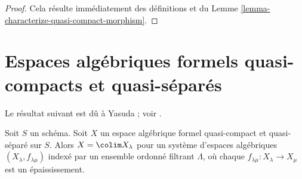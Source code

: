 \begin{proof}
Cela résulte immédiatement des définitions et du
Lemme \ref{lemma-characterize-quasi-compact-morphism}.
\end{proof}





\section{Espaces algébriques formels quasi-compacts et quasi-séparés}
\label{section-quasi-compact-quasi-separated}

\noindent
Le résultat suivant est dû à Yasuda ; voir
\cite[Proposition 3.32]{Yasuda}.

\begin{lemma}
\label{lemma-structure-quasi-compact-quasi-separated}
\begin{reference}
\cite[Proposition 3.32]{Yasuda}
\end{reference}
Soit $S$ un schéma. Soit $X$ un espace algébrique formel quasi-compact et
quasi-séparé sur $S$. Alors $X = \colim X_\lambda$
pour un système d'espaces algébriques $(X_\lambda, f_{\lambda \mu})$
indexé par un ensemble ordonné filtrant $\Lambda$, où chaque
$f_{\lambda \mu} : X_\lambda \to X_\mu$ est un épaississement.
\end{lemma}

